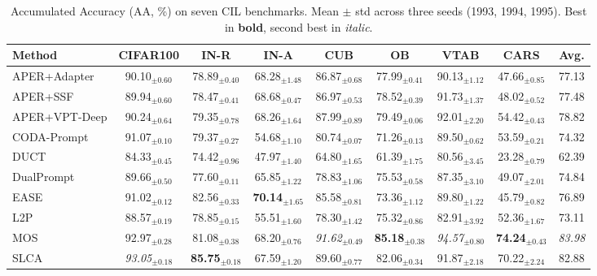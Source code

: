 \begin{table}[!t]
\centering
\caption{Accumulated Accuracy (AA, \%) on seven CIL benchmarks. Mean $\pm$ std across three seeds (1993, 1994, 1995). Best in \textbf{bold}, second best in \textit{italic}.}
\label{tab:overall-aa-standalone}
\renewcommand{\arraystretch}{0.95}
\begin{adjustbox}{max width=\textwidth}
\footnotesize
\begin{tabular}{l c c c c c c c c}
\toprule
Method & \textbf{CIFAR100} & \textbf{IN-R} & \textbf{IN-A} & \textbf{CUB} & \textbf{OB} & \textbf{VTAB} & \textbf{CARS} & \textbf{Avg.} \\
\midrule
APER+Adapter & 90.10$_{\pm 0.60}$ & 78.89$_{\pm 0.40}$ & 68.28$_{\pm 1.48}$ & 86.87$_{\pm 0.68}$ & 77.99$_{\pm 0.41}$ & 90.13$_{\pm 1.12}$ & 47.66$_{\pm 0.85}$ & 77.13 \\
APER+SSF & 89.94$_{\pm 0.60}$ & 78.47$_{\pm 0.41}$ & 68.68$_{\pm 0.47}$ & 86.97$_{\pm 0.53}$ & 78.52$_{\pm 0.39}$ & 91.73$_{\pm 1.37}$ & 48.02$_{\pm 0.52}$ & 77.48 \\
APER+VPT-Deep & 90.24$_{\pm 0.64}$ & 79.35$_{\pm 0.78}$ & 68.26$_{\pm 1.64}$ & 87.99$_{\pm 0.89}$ & 79.49$_{\pm 0.06}$ & 92.01$_{\pm 2.20}$ & 54.42$_{\pm 0.43}$ & 78.82 \\
CODA-Prompt & 91.07$_{\pm 0.10}$ & 79.37$_{\pm 0.27}$ & 54.68$_{\pm 1.10}$ & 80.74$_{\pm 0.07}$ & 71.26$_{\pm 0.13}$ & 89.50$_{\pm 0.62}$ & 53.59$_{\pm 0.21}$ & 74.32 \\
DUCT & 84.33$_{\pm 0.45}$ & 74.42$_{\pm 0.96}$ & 47.97$_{\pm 1.40}$ & 64.80$_{\pm 1.65}$ & 61.39$_{\pm 1.75}$ & 80.56$_{\pm 3.45}$ & 23.28$_{\pm 0.79}$ & 62.39 \\
DualPrompt & 89.66$_{\pm 0.50}$ & 77.60$_{\pm 0.11}$ & 65.85$_{\pm 1.22}$ & 78.83$_{\pm 1.06}$ & 75.53$_{\pm 0.58}$ & 87.35$_{\pm 3.10}$ & 49.07$_{\pm 2.01}$ & 74.84 \\
EASE & 91.02$_{\pm 0.12}$ & 82.56$_{\pm 0.33}$ & \textbf{70.14}$_{\pm 1.65}$ & 85.58$_{\pm 0.81}$ & 73.36$_{\pm 1.12}$ & 89.80$_{\pm 1.22}$ & 45.79$_{\pm 0.82}$ & 76.89 \\
L2P & 88.57$_{\pm 0.19}$ & 78.85$_{\pm 0.15}$ & 55.51$_{\pm 1.60}$ & 78.30$_{\pm 1.42}$ & 75.32$_{\pm 0.86}$ & 82.91$_{\pm 3.92}$ & 52.36$_{\pm 1.67}$ & 73.11 \\
MOS & 92.97$_{\pm 0.28}$ & 81.08$_{\pm 0.38}$ & 68.20$_{\pm 0.76}$ & \textit{91.62}$_{\pm 0.49}$ & \textbf{85.18}$_{\pm 0.38}$ & \textit{94.57}$_{\pm 0.80}$ & \textbf{74.24}$_{\pm 0.43}$ & \textit{83.98} \\
SLCA & \textit{93.05}$_{\pm 0.18}$ & \textbf{85.75}$_{\pm 0.18}$ & 67.59$_{\pm 1.20}$ & 89.60$_{\pm 0.77}$ & 82.06$_{\pm 0.34}$ & 91.87$_{\pm 2.18}$ & 70.22$_{\pm 2.24}$ & 82.88 \\

\end{tabular}
\end{adjustbox}
\end{table}

